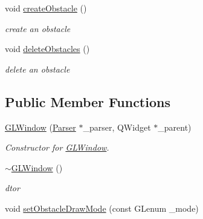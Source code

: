 \begin{DoxyCompactItemize}
void \hyperlink{classGLWindow_a9746b445fc2d9d4f01443b838619884e}{createObstacle} ()
\begin{DoxyCompactList}\small\item\em create an obstacle \item\end{DoxyCompactList}\item 
void \hyperlink{classGLWindow_a602754667c54e2dd5782b7e179ca4b20}{deleteObstacles} ()
\begin{DoxyCompactList}\small\item\em delete an obstacle \item\end{DoxyCompactList}\end{DoxyCompactItemize}
\subsection*{Public Member Functions}
\begin{DoxyCompactItemize}
\item 
\hyperlink{classGLWindow_a9990e7ea36d81bffec2cec95dc4513ba}{GLWindow} (\hyperlink{classParser}{Parser} $\ast$\_\-parser, QWidget $\ast$\_\-parent)
\begin{DoxyCompactList}\small\item\em Constructor for \hyperlink{classGLWindow}{GLWindow}. \item\end{DoxyCompactList}\item 
\hyperlink{classGLWindow_a2eeaea2148f4f72344edd6d1bac9759b}{$\sim$GLWindow} ()
\begin{DoxyCompactList}\small\item\em dtor \item\end{DoxyCompactList}\item 
void \hyperlink{classGLWindow_a87f057e5282c7f11a86bdcf4a554db88}{setObstacleDrawMode} (const GLenum \_\-mode)
\end{DoxyCompactItemize}
